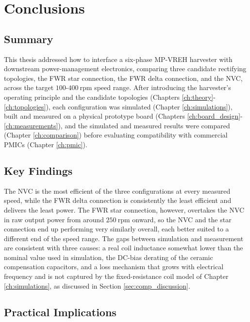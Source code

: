 \chapter{Conclusions}
\label{ch:conclusions}

\section{Summary}
\label{sec:conclusions_summary}

This thesis addressed how to interface a six-phase MP-VREH harvester with downstream power-management electronics, comparing three candidate rectifying topologies, the FWR star connection, the FWR delta connection, and the NVC, across the target $100$-$400\ \text{rpm}$ speed range. After introducing the harvester's operating principle and the candidate topologies (Chapters \ref{ch:theory}-\ref{ch:topologies}), each configuration was simulated (Chapter \ref{ch:simulations}), built and measured on a physical prototype board (Chapters \ref{ch:board_design}-\ref{ch:measurements}), and the simulated and measured results were compared (Chapter \ref{ch:comparison}) before evaluating compatibility with commercial PMICs (Chapter \ref{ch:pmic}).

\section{Key Findings}
\label{sec:conclusions_findings}

The NVC is the most efficient of the three configurations at every measured speed, while the FWR delta connection is consistently the least efficient and delivers the least power. The FWR star connection, however, overtakes the NVC in raw output power from around $250\ \text{rpm}$ onward, so the NVC and the star connection end up performing very similarly overall, each better suited to a different end of the speed range. The gaps between simulation and measurement are consistent with three causes: a real coil inductance somewhat lower than the nominal value used in simulation, the DC-bias derating of the ceramic compensation capacitors, and a loss mechanism that grows with electrical frequency and is not captured by the fixed-resistance coil model of Chapter \ref{ch:simulations}, as discussed in Section \ref{sec:comp_discussion}.

\section{Practical Implications}
\label{sec:conclusions_implications}

